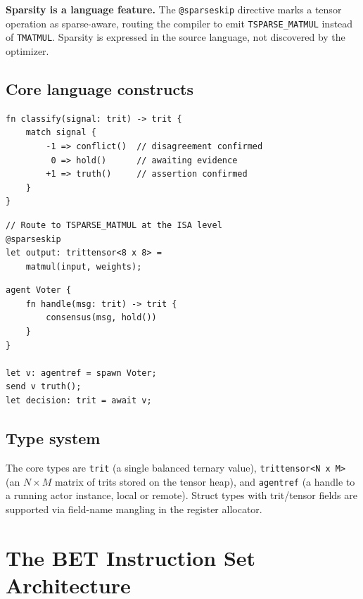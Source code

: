 \documentclass[journal,10pt,twocolumn]{IEEEtran}
\begin{document}
\textbf{Sparsity is a language feature.} The \texttt{@sparseskip} directive
marks a tensor operation as sparse-aware, routing the compiler to emit
\texttt{TSPARSE\_MATMUL} instead of \texttt{TMATMUL}. Sparsity is expressed
in the source language, not discovered by the optimizer.

\subsection{Core language constructs}

\begin{lstlisting}[caption={Ternary classifier with exhaustive match}]
fn classify(signal: trit) -> trit {
    match signal {
        -1 => conflict()  // disagreement confirmed
         0 => hold()      // awaiting evidence
        +1 => truth()     // assertion confirmed
    }
}
\end{lstlisting}

\begin{lstlisting}[caption={Sparse matrix multiply with @sparseskip}]
// Route to TSPARSE_MATMUL at the ISA level
@sparseskip
let output: trittensor<8 x 8> =
    matmul(input, weights);
\end{lstlisting}

\begin{lstlisting}[caption={Actor model for ternary message passing}]
agent Voter {
    fn handle(msg: trit) -> trit {
        consensus(msg, hold())
    }
}

let v: agentref = spawn Voter;
send v truth();
let decision: trit = await v;
\end{lstlisting}

\subsection{Type system}

The core types are \texttt{trit} (a single balanced ternary value),
\texttt{trittensor<N x M>} (an $N \times M$ matrix of trits stored on the
tensor heap), and \texttt{agentref} (a handle to a running actor instance,
local or remote). Struct types with trit/tensor fields are supported via
field-name mangling in the register allocator.

\section{The BET Instruction Set Architecture}
\label{sec:isa}
\end{document}
